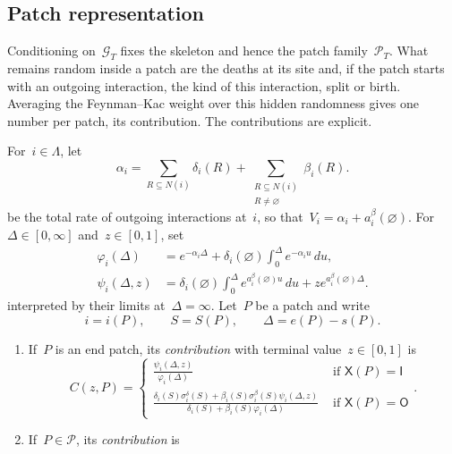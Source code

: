 \documentclass[EJP,preprint,NODS,nobera]{ejpecp}
\newcommand{\R}{\mathbb{R}}
\newcommand{\pw}[4]{\left\{\begin{array}{cl}
  #1 &\text{ if } #2 \\
  #3 &\text{ if } #4
\end{array}\right.}
\newcommand{\chg}[1]{{\color{changegreen}#1}}
\begin{document}
\subsection{Patch representation}
\label{subsec:patch-representation}

\chg{Conditioning on~$\mathcal G_T$ fixes the skeleton and hence the patch
family~$\mathcal P_T$. What remains random inside a patch are the deaths at
its site and, if the patch starts with an outgoing interaction, the kind of
this interaction, split or birth. Averaging the Feynman--Kac weight over this
hidden randomness gives one number per patch, its contribution. The
contributions are explicit.}

\chg{\begin{definition}
\label{def:patch-contributions}
For~$i\in\Lambda$, let
\begin{equation*}
\alpha_i
=
\sum_{R\subseteq N(i)}\delta_i(R)
+
\sum_{\substack{R\subseteq N(i)\\R\neq\varnothing}}\beta_i(R).
\end{equation*}
be the total rate of outgoing interactions at~$i$, so
that~$V_i=\alpha_i+a_i^\beta(\varnothing)$. For~$\Delta\in[0,\infty]$
and~$z\in[0,1]$, set
\begin{align}
\varphi_i(\Delta)
&=
e^{-\alpha_i\Delta}
+
\delta_i(\varnothing)
\int_0^\Delta e^{-\alpha_i u}\,du,
\label{eq:patch-phi}
\\
\psi_i(\Delta,z)
&=
\delta_i(\varnothing)
\int_0^\Delta e^{a_i^\beta(\varnothing)u}\,du
+
z e^{a_i^\beta(\varnothing)\Delta}.
\label{eq:patch-psi}
\end{align}
interpreted by their limits at~$\Delta=\infty$. Let~$P$ be a patch and write
\begin{equation*}
i=i(P),
\qquad
S=S(P),
\qquad
\Delta=e(P)-s(P).
\end{equation*}
\begin{enumerate}[label=\textup{(\alph*)}]
\item If~$P$ is an end patch, its \emph{contribution} with terminal
value~$z\in[0,1]$ is
\begin{equation}
\label{eq:end-contribution-formulas}
C(z,P)
=
\pw{
\displaystyle
\frac{\psi_i(\Delta,z)}{\varphi_i(\Delta)}
}{\mathsf X(P)=\mathsf I}
{
\displaystyle
\frac{
\delta_i(S)\sigma_i^\delta(S)
+
\beta_i(S)\sigma_i^\beta(S)\psi_i(\Delta,z)
}{
\delta_i(S)+\beta_i(S)\varphi_i(\Delta)
}
}{\mathsf X(P)=\mathsf O}.
\end{equation}
\item If~$P\in\mathcal P$, its \emph{contribution} is

\end{enumerate}
\end{definition}}
\end{document}

